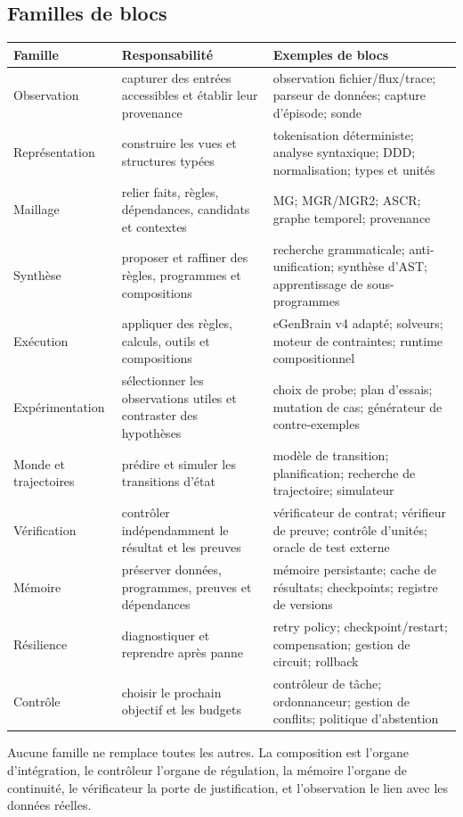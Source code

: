\documentclass[11pt,a4paper]{article}
\begin{document}
\subsection{Familles de blocs}
\begin{longtable}{p{}p{}p{}}
\toprule Famille & Responsabilité & Exemples de blocs \\
\midrule
Observation & capturer des entrées accessibles et établir leur provenance & observation fichier/flux/trace; parseur de données; capture d'épisode; sonde \\
Représentation & construire les vues et structures typées & tokenisation déterministe; analyse syntaxique; DDD; normalisation; types et unités \\
Maillage & relier faits, règles, dépendances, candidats et contextes & MG; MGR/MGR2; ASCR; graphe temporel; provenance \\
Synthèse & proposer et raffiner des règles, programmes et compositions & recherche grammaticale; anti-unification; synthèse d'AST; apprentissage de sous-programmes \\
Exécution & appliquer des règles, calculs, outils et compositions & eGenBrain v4 adapté; solveurs; moteur de contraintes; runtime compositionnel \\
Expérimentation & sélectionner les observations utiles et contraster des hypothèses & choix de probe; plan d'essais; mutation de cas; générateur de contre-exemples \\
Monde et trajectoires & prédire et simuler les transitions d'état & modèle de transition; planification; recherche de trajectoire; simulateur \\
Vérification & contrôler indépendamment le résultat et les preuves & vérificateur de contrat; vérifieur de preuve; contrôle d'unités; oracle de test externe \\
Mémoire & préserver données, programmes, preuves et dépendances & mémoire persistante; cache de résultats; checkpoints; registre de versions \\
Résilience & diagnostiquer et reprendre après panne & retry policy; checkpoint/restart; compensation; gestion de circuit; rollback \\
Contrôle & choisir le prochain objectif et les budgets & contrôleur de tâche; ordonnanceur; gestion de conflits; politique d'abstention \\
\bottomrule
\end{longtable}
Aucune famille ne remplace toutes les autres. La composition est l'organe d'intégration, le contrôleur l'organe de régulation, la mémoire l'organe de continuité, le vérificateur la porte de justification, et l'observation le lien avec les données réelles.
\end{document}
